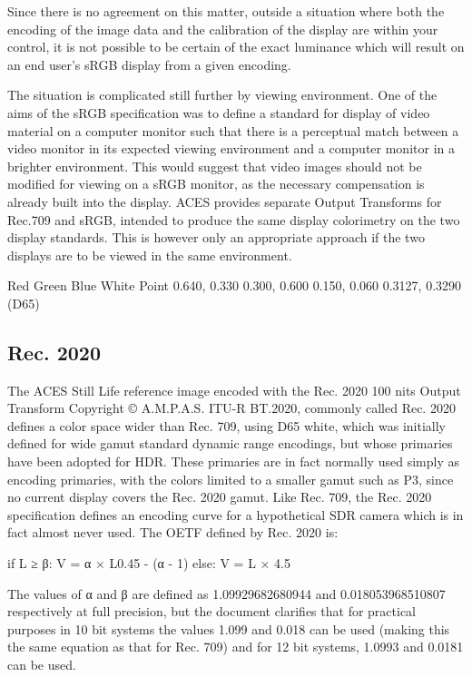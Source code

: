 Since there is no agreement on this matter, outside a situation where both the encoding of the image data and the calibration of the display are within your control, it is not possible to be certain of the exact luminance which will result on an end user's sRGB display from a given encoding.

The situation is complicated still further by viewing environment. One of the aims of the sRGB specification was to define a standard for display of video material on a computer monitor such that there is a perceptual match between a video monitor in its expected viewing environment and a computer monitor in a brighter environment. This would suggest that video images should not be modified for viewing on a sRGB monitor, as the necessary compensation is already built into the display. ACES provides separate Output Transforms for Rec.709 and sRGB, intended to produce the same display colorimetry on the two display standards. This is however only an appropriate approach if the two displays are to be viewed in the same environment.



Red
Green
Blue
White Point
0.640, 0.330
0.300, 0.600
0.150, 0.060
0.3127, 0.3290 (D65)

\subsection{Rec. 2020}%
\label{subsec:rec-2020}

The ACES Still Life reference image encoded with the Rec. 2020 100 nits Output Transform
Copyright © A.M.P.A.S.
ITU-R BT.2020, commonly called Rec. 2020 defines a color space wider than Rec. 709, using D65 white, which was initially defined for wide gamut standard dynamic range encodings, but whose primaries have been adopted for HDR. These primaries are in fact normally used simply as encoding primaries, with the colors limited to a smaller gamut such as P3, since no current display covers the Rec. 2020 gamut. Like Rec. 709, the Rec. 2020 specification defines an encoding curve for a hypothetical SDR camera which is in fact almost never used. The OETF defined by Rec. 2020 is:

	if L ≥ β:
            		V = α × L0.45 - (α - 1)
	else:
		V = L × 4.5

The values of α and β are defined as 1.09929682680944 and 0.018053968510807 respectively at full precision, but the document clarifies that for practical purposes in 10 bit systems the values 1.099 and 0.018 can be used (making this the same equation as that for Rec. 709) and for 12 bit systems, 1.0993 and 0.0181 can be used.


